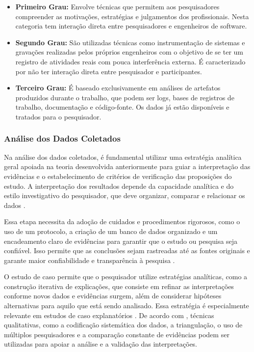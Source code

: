 \begin{itemize}
    \item \textbf{Primeiro Grau:} Envolve técnicas que permitem aos pesquisadores compreender as motivações, estratégias e julgamentos dos profissionais. Nesta categoria tem interação direta entre pesquisadores e engenheiros de software. 
    
    \item \textbf{Segundo Grau:} São utilizadas técnicas como instrumentação de sistemas e gravações realizadas pelos próprios engenheiros com o objetivo de se ter um registro de atividades reais com pouca interferência externa. É caracterizado por não ter interação direta entre pesquisador e participantes.
    
    \item \textbf{Terceiro Grau:} É baseado exclusivamente em análises de artefatos produzidos durante o trabalho, que podem ser logs, bases de registros de trabalho, documentação e código-fonte. Os dados já estão disponíveis e tratados para o pesquisador.
\end{itemize}

\subsubsection{Análise dos Dados Coletados}

Na análise dos dados coletados, é fundamental utilizar uma estratégia analítica geral apoiada na teoria desenvolvida anteriormente para guiar a interpretação das evidências e o estabelecimento de critérios de verificação das proposições do estudo. A interpretação dos resultados depende da capacidade analítica e do estilo investigativo do pesquisador, que deve organizar, comparar e relacionar os dados \cite{yin2001}.

Essa etapa necessita da adoção de cuidados e procedimentos rigorosos, como o uso de um protocolo, a criação de um banco de dados organizado e um encadeamento claro de evidências para garantir que o estudo ou pesquisa seja confiável. Isso permite que as conclusões sejam rastreadas até as fontes originais e garante maior confiabilidade e transparência à pesquisa \cite{yin2001}. 

O estudo de caso permite que o pesquisador utilize estratégias analíticas, como a construção iterativa de explicações, que consiste em refinar as interpretações conforme novos dados e evidências surgem, além de considerar hipóteses alternativas para aquilo que está sendo analisado. Essa estratégia é especialmente relevante em estudos de caso explanatórios \cite{yin2001}. De acordo com , técnicas qualitativas, como a codificação sistemática dos dados, a triangulação, o uso de múltiplos pesquisadores e a comparação constante de evidências podem ser utilizadas para apoiar a análise e a validação das interpretações.

